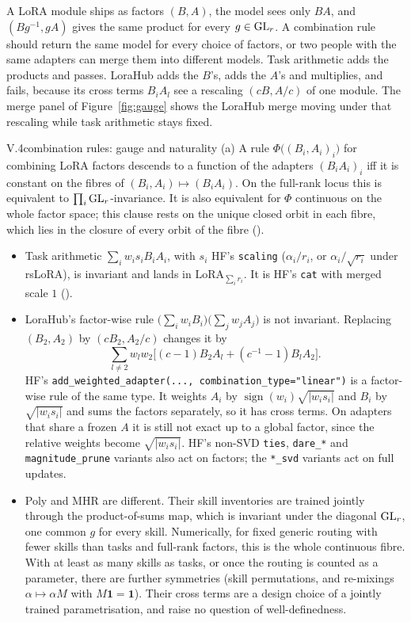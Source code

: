 A LoRA module ships as factors $(B,A)$, the model sees only $BA$, and $(Bg^{-1},gA)$ gives the same product for every
$g\in\mathrm{GL}_r$. A combination rule should return the same model for every choice of factors, or two people with the same
adapters can merge them into different models. Task arithmetic adds the products and passes. LoraHub adds the $B$'s,
adds the $A$'s and multiplies, and fails, because its cross terms $B_iA_l$ see a rescaling $(cB,A/c)$ of one module.
The merge panel of Figure~\ref{fig:gauge} shows the LoraHub merge moving under that rescaling while task arithmetic
stays fixed.

\begin{proposition}{V.4}{combination rules: gauge and naturality}
(a) A rule $\Phi\big((B_i,A_i)_i\big)$ for combining LoRA factors descends to a function of the adapters $(B_iA_i)_i$
iff it is constant on the fibres of $(B_i,A_i)\mapsto(B_iA_i)$. On the full-rank locus this is equivalent to
$\prod_i\mathrm{GL}_r$-invariance. It is also equivalent for $\Phi$ continuous on the whole factor space; this clause rests on
the unique closed orbit in each fibre, which lies in the closure of every orbit of the fibre ().
\begin{itemize}
  \item Task arithmetic $\sum_iw_is_iB_iA_i$, with $s_i$ HF's \texttt{scaling} ($\alpha_i/r_i$, or $\alpha_i/\sqrt{r_i}$
  under rsLoRA), is invariant and lands in $\mathrm{LoRA}_{\sum_ir_i}$. It is HF's \texttt{cat} with merged scale $1$
  ().
  \item LoraHub's factor-wise rule $\big(\sum_iw_iB_i\big)\big(\sum_jw_jA_j\big)$ is not invariant. Replacing
  $(B_2,A_2)$ by $(cB_2,A_2/c)$ changes it by
  \[\sum_{l\ne2}w_lw_2\big[(c-1)B_2A_l+(c^{-1}-1)B_lA_2\big].\]
  HF's \texttt{add\_\allowbreak weighted\_\allowbreak adapter(..., combination\_\allowbreak type="linear")} is a
  factor-wise rule of the same type. It weights $A_i$ by $\operatorname{sign}(w_i)\sqrt{\lvert w_is_i\rvert}$ and $B_i$
  by $\sqrt{\lvert w_is_i\rvert}$ and sums the factors separately, so it has cross terms. On adapters that share a
  frozen $A$ it is still not exact up to a global factor, since the relative weights become
  $\sqrt{\lvert w_is_i\rvert}$. HF's non-SVD \texttt{ties}, \texttt{dare\_*} and \texttt{magnitude\_prune} variants
  also act on factors; the \texttt{*\_svd} variants act on full updates.
  \item Poly and MHR are different. Their skill inventories are trained jointly through the product-of-sums map, which
  is invariant under the diagonal $\mathrm{GL}_r$, one common $g$ for every skill. Numerically, for fixed generic routing with
  fewer skills than tasks and full-rank factors, this is the whole continuous fibre. With at least as many skills as
  tasks, or once the routing is counted as a parameter, there are further symmetries (skill permutations, and
  re-mixings $\alpha\mapsto\alpha M$ with $M\mathbf 1=\mathbf 1$). Their cross terms are a design choice of a jointly
  trained parametrisation, and raise no question of well-definedness.
\end{itemize}


\end{proposition}
